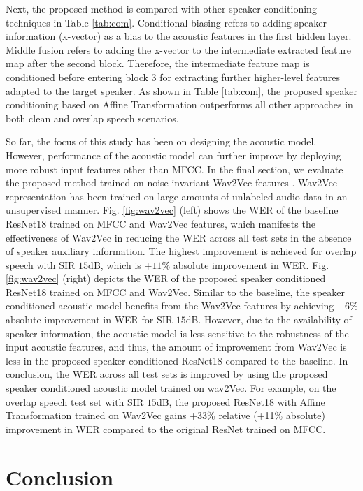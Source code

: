 \documentclass{article}
\begin{document}
Next, the proposed method is compared with other speaker conditioning techniques in Table \ref{tab:com}. Conditional biasing refers to adding speaker information (x-vector) as a bias to the acoustic features in the first hidden layer. Middle fusion refers to adding the x-vector to the intermediate extracted feature map after the second block. Therefore, the intermediate feature map is conditioned before entering block 3 for extracting further higher-level features adapted to the target speaker. As shown in Table \ref{tab:com}, the proposed speaker conditioning based on Affine Transformation outperforms all other approaches in both clean and overlap speech scenarios. 

So far, the focus of this study has been on designing the acoustic model. However,  performance of the acoustic model can further improve by deploying more robust input features other than MFCC. In the final section, we evaluate the proposed method trained on noise-invariant Wav2Vec features \cite{schneider2019wav2vec}. Wav2Vec representation has been trained on large amounts of unlabeled audio data in an unsupervised manner. Fig. \ref{fig:wav2vec} (left) shows the WER of the baseline ResNet18 trained on MFCC and Wav2Vec features, which manifests the effectiveness of Wav2Vec in reducing the WER across all test sets in the absence of speaker auxiliary information. The highest improvement is achieved for overlap speech with SIR $15$dB, which is $+11\%$ absolute improvement in WER. Fig.\ref{fig:wav2vec} (right) depicts the WER of the proposed speaker conditioned ResNet18 trained on MFCC and Wav2Vec. Similar to the baseline, the speaker conditioned acoustic model benefits from the Wav2Vec features by achieving $+6\%$ absolute improvement in WER for SIR $15$dB. However, due to the availability of speaker information, the acoustic model is less sensitive to the robustness of the input acoustic features, and thus, the amount of improvement from Wav2Vec is less in the proposed speaker conditioned ResNet18 compared to the baseline. In conclusion, the WER across all test sets is improved by using the proposed speaker conditioned acoustic model trained on wav2Vec. For example, on the overlap speech test set with SIR $15$dB, the proposed ResNet18 with Affine Transformation trained on Wav2Vec gains +33\% relative (+11\% absolute) improvement in WER compared to the original ResNet trained on MFCC.


\section{Conclusion}
\label{sec:con}
\end{document}
